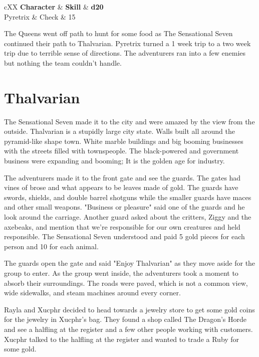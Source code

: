 \begin{DndTable}[color=PhbLightCyan]{cXX}
	\textbf{Character} & \textbf{Skill} & \textbf{d20} \\
	Pyretrix & Check & 15\\
\end{DndTable}

The Queens went off path to hunt for some food as The Sensational Seven continued their path to Thalvarian.
Pyretrix turned a 1 week trip to a two week trip due to terrible sense of directions.
The adventurers ran into a few enemies but nothing the team couldn't handle.

\section*{Thalvarian}

The Sensational Seven made it to the city and were amazed by the view from the outside.
Thalvarian is a stupidly large city state. Walls built all around the pyramid-like shape town.
White marble buildings and big booming businesses with the streets filled with townspeople.
The black-powered and government business were expanding and booming; It is the golden age for industry.

The adventurers made it to the front gate and see the guards. 
The gates had vines of brose and what appears to be leaves made of gold.
The guards have swords, shields, and double barrel shotguns while the smaller guards have maces and other small weapons.
"Business or pleasure" said one of the guards and he look around the carriage.
Another guard asked about the critters, Ziggy and the axebeaks, and mention that we're responsible for our own creatures and held responsible.
The Sensational Seven understood and paid 5 gold pieces for each person and 10 for each animal.

The guards open the gate and said "Enjoy Thalvarian" as they move aside for the group to enter.
As the group went inside, the adventurers took a moment to absorb their surroundings.
The roads were paved, which is not a common view, wide sidewalks, and steam machines around every corner.


Rayla and Xucphr decided to head towards a jewelry store to get some gold coins for the jewelry in Xucphr's bag.
They found a shop called The Dragon's Horde and see a halfling at the register and a few other people working with customers.
Xucphr talked to the halfling at the register and wanted to trade a Ruby for some gold.

